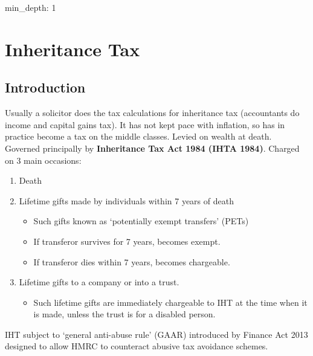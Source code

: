 \documentclass[
]{article}
\author{}
\date{}
\newenvironment{Shaded}{}{}
\newcommand{\NormalTok}[1]{#1}
\providecommand{\tightlist}{%
  \setlength{\itemsep}{0pt}\setlength{\parskip}{0pt}}
\begin{document}
{
\setcounter{tocdepth}{3}
\tableofcontents
}
\begin{Shaded}
\begin{Highlighting}[]
\NormalTok{min\_depth: 1}
\end{Highlighting}
\end{Shaded}

\hypertarget{inheritance-tax}{%
\section{Inheritance Tax}\label{inheritance-tax}}

\hypertarget{introduction}{%
\subsection{Introduction}\label{introduction}}

Usually a solicitor does the tax calculations for inheritance tax
(accountants do income and capital gains tax). It has not kept pace with
inflation, so has in practice become a tax on the middle classes. Levied
on wealth at death. Governed principally by \textbf{Inheritance Tax Act
1984 (IHTA 1984)}. Charged on 3 main occasions:

\begin{enumerate}
\def\labelenumi{\arabic{enumi}.}
\tightlist
\item
  Death
\item
  Lifetime gifts made by individuals within 7 years of death

  \begin{itemize}
  \tightlist
  \item
    Such gifts known as `potentially exempt transfers' (PETs)
  \item
    If transferor survives for 7 years, becomes exempt.
  \item
    If transferor dies within 7 years, becomes chargeable.
  \end{itemize}
\item
  Lifetime gifts to a company or into a trust.

  \begin{itemize}
  \tightlist
  \item
    Such lifetime gifts are immediately chargeable to IHT at the time
    when it is made, unless the trust is for a disabled person.
  \end{itemize}
\end{enumerate}

IHT subject to `general anti-abuse rule' (GAAR) introduced by Finance
Act 2013 designed to allow HMRC to counteract abusive tax avoidance
schemes.
\end{document}
